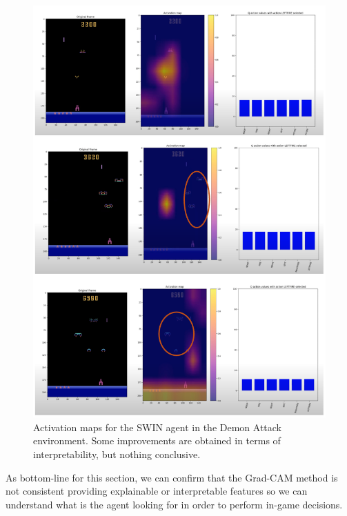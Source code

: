 \begin{figure}[!h]
	\centering
	\includegraphics[width=0.7\linewidth]{figures/demonattack_act_maps}
	\caption{Activation maps for the SWIN agent in the Demon Attack environment. Some improvements are obtained in terms of interpretability, but nothing conclusive.}
	\label{fig:demonattackactmaps}
\end{figure}
 
As bottom-line for this section, we can confirm that the Grad-CAM method is not consistent providing explainable or interpretable features so we can understand what is the agent looking for in order to perform in-game decisions.

